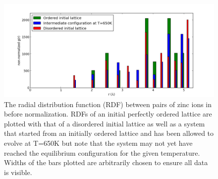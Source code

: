 \begin{figure}[h!]
  \centering
    \includegraphics[width=1.0\textwidth]{figures/RDF_Z-Z.png}
    \caption{The radial distribution function (RDF) between pairs of zinc ions in {\CZTS} before normalization. RDFs of an initial perfectly ordered lattice are plotted with that of a disordered initial lattice as well as a system that started from an initially ordered lattice and has been allowed to evolve at T=650K but note that the system may not yet have reached the equilibrium configuration for the given temperature. Widths of the bars plotted are arbitrarily chosen to ensure all data is visible.}
  \label{RDF_Z-Z}
\end{figure}







